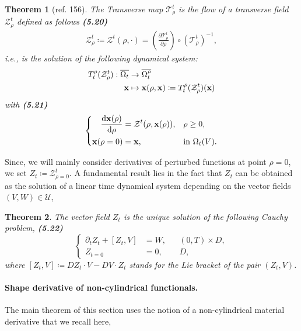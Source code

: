 \documentclass[oneside]{book}
\numberwithin{equation}{section}
\newtheorem{theorem}{Theorem}[chapter]
\begin{document}
\begin{theorem}[ref. 156]
	The Transverse map $\mathcal{T}_\rho^t$ is the flow of a transverse field $\mathcal{Z}_\rho^t$ defined as follows \textbf{(5.20)}
	\begin{align*}
		\mathcal{Z}_\rho^t\coloneqq\mathcal{Z}^t(\rho,\cdot) = \left(\frac{\partial\mathcal{T}_\rho^t}{\partial\rho}\right)\circ(\mathcal{T}_\rho^t)^{-1},
	\end{align*}
	i.e., is the solution of the following dynamical system:
	\begin{align*}
		T_t^\rho(\mathcal{Z}_\rho^t):\overline{\Omega_t}&\to\overline{\Omega_t^\rho}\\
		{\bf x}&\mapsto{\bf x}(\rho,{\bf x})\coloneqq T_t^\rho(\mathcal{Z}_\rho^t)({\bf x})
	\end{align*}
	with \textbf{(5.21)}
	\begin{equation*}
		\left\{\begin{split}
			\frac{{\rm d}{\bf x}(\rho)}{{\rm d}\rho} &= \mathcal{Z}^t(\rho,{\bf x}(\rho)),&&\rho\ge 0,\\
			{\bf x}(\rho = 0) &= {\bf x},&&\mbox{in }\Omega_t(V).
		\end{split}\right.
	\end{equation*}
\end{theorem}
Since, we will mainly consider derivatives of perturbed functions at point $\rho = 0$, we set $Z_t\coloneqq\mathcal{Z}_{\rho = 0}^t$. A fundamental result lies in the fact that $Z_t$ can be obtained as the solution of a linear time dynamical system depending on the vector fields $(V,W)\in\mathcal{U}$,

\begin{theorem}
	The vector field $Z_t$ is the unique solution of the following Cauchy problem, \textbf{(5.22)}
	\begin{equation*}
		\left\{\begin{split}
			\partial_tZ_t + [Z_t,V] &= W,&&(0,T)\times D,\\
			Z_{t=0} &= 0,&&D,
		\end{split}\right.
	\end{equation*}
	where $[Z_t,V]\coloneqq DZ_t\cdot V- DV\cdot Z_t$ stands for the Lie bracket of the pair $(Z_t,V)$.
\end{theorem}

\paragraph{Shape derivative of non-cylindrical functionals.} The main theorem of this section uses the notion of a non-cylindrical material derivative that we recall here,
\end{document}
